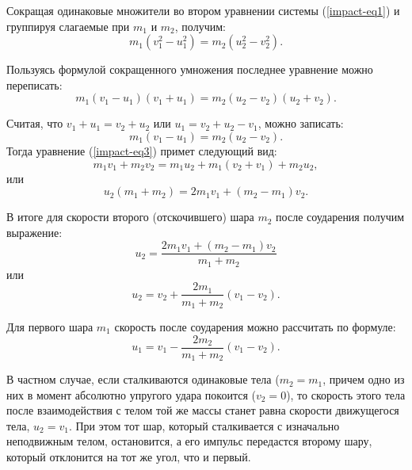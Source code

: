 \documentclass[14pt,a4paper,oneside]{extarticle}	%
\begin{document}
Сокращая одинаковые множители во втором уравнении системы (\ref{impact-eq1}) и группируя слагаемые при $ m_1 $ и $ m_2 $, получим:
\begin{equation}\label{impact-eq2}
m_{1}(v_{1}^{2} - u_{1}^{2}) = m_{2}(u_{2}^{2} - v_{2}^{2}).
\end{equation}

Пользуясь формулой сокращенного умножения последнее уравнение можно переписать:
\begin{equation}\label{impact-eq3}
m_{1}(v_{1} - u_{1})(v_{1} + u_{1}) = m_{2}(u_{2} - v_{2})(u_{2} + v_{2}).
\end{equation}

Считая, что $ v_{1} + u_{1} = v_{2} + u_{2}  $ или $ u_{1} = v_{2} + u_{2} - v_{1} $, можно записать:
\begin{equation}\label{impact-eq4}
m_{1}(v_{1} - u_{1}) = m_{2}(u_{2} - v_{2}).
\end{equation}
Тогда уравнение (\ref{impact-eq3}) примет следующий вид:
\begin{equation}\label{impact-eq5}
m_{1}v_{1} + m_{2}v_{2} = m_{1}u_{2} + m_{1} (v_{2} + v_{1}) + m_{2}u_{2},
\end{equation}
или
\begin{equation}\label{impact-eq6}
u_{2} (m_{1}+m_{2}) = 2m_{1}v_{1} + (m_{2}-m_{1})v_{2}.
\end{equation}

В итоге для скорости второго (отскочившего) шара $ m_{2} $ после соударения получим выражение:
\begin{equation}\label{impact-eq7}
u_{2} = \frac{ 2m_{1}v_{1} + (m_{2}-m_{1})v_{2}}{m_{1}+m_{2}}
\end{equation}
или
\begin{equation}\label{impact-eq8}
u_{2} = v_{2} + \frac{ 2m_{1}}{m_{1}+m_{2}} (v_{1}-v_{2}).
\end{equation}

Для первого шара $ m_{1} $ скорость после соударения можно рассчитать по формуле:
\begin{equation}\label{impact-eq9}
u_{1} = v_{1} - \frac{ 2m_{2}}{m_{1}+m_{2}} (v_{1}-v_{2}).
\end{equation}

В частном случае, если сталкиваются одинаковые тела ($ m_{2}=m_{1} $, причем одно из них в момент абсолютно упругого удара покоится ($ v_{2}=0 $), то скорость этого тела после взаимодействия с телом той же массы станет равна скорости движущегося тела, $ u_{2}=v_{1} $.
При этом тот шар, который сталкивается с изначально неподвижным телом, остановится, а его импульс передастся второму шару, который отклонится на тот же угол, что и первый.
\end{document}
